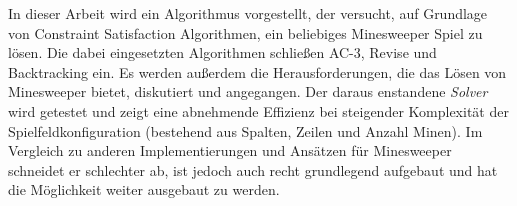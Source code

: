 %
\vspace*{0.4cm}

\noindent 
In dieser Arbeit wird ein Algorithmus vorgestellt, der versucht, auf Grundlage von Constraint Satisfaction Algorithmen, ein beliebiges 
Minesweeper Spiel zu lösen. Die dabei eingesetzten Algorithmen schließen AC-3, Revise und Backtracking ein. Es werden außerdem die
Herausforderungen, die das Lösen von Minesweeper bietet, diskutiert und angegangen. Der daraus enstandene \textit{Solver} wird getestet
und zeigt eine abnehmende Effizienz bei steigender Komplexität der Spielfeldkonfiguration (bestehend aus Spalten, Zeilen und Anzahl Minen).
Im Vergleich zu anderen Implementierungen und Ansätzen für Minesweeper schneidet er schlechter ab, ist jedoch auch recht grundlegend aufgebaut
und hat die Möglichkeit weiter ausgebaut zu werden.